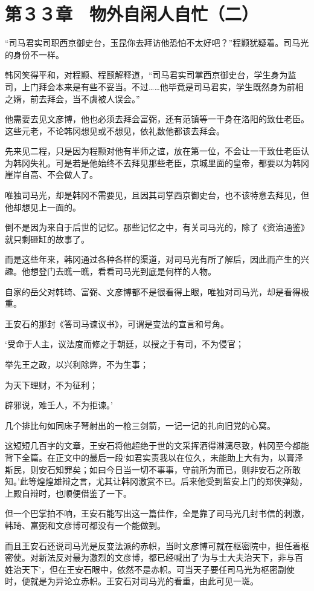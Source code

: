 \section{第３３章　物外自闲人自忙（二）}

“司马君实司职西京御史台，玉昆你去拜访他恐怕不太好吧？”程颢犹疑着。司马光的身份不一样。

韩冈笑得平和，对程颢、程颐解释道，“司马君实司掌西京御史台，学生身为监司，上门拜会本来是有些不妥当。不过……他毕竟是司马君实，学生既然身为前相之婿，前去拜会，当不虞被人误会。”

他需要去见文彦博，他也必须去拜会富弼，还有范镇等一干身在洛阳的致仕老臣。这些元老，不论韩冈想见或不想见，依礼数他都该去拜会。

先来见二程，只是因为程颢对他有半师之谊，放在第一位，不会让一干致仕老臣认为韩冈失礼。可是若是他始终不去拜见那些老臣，京城里面的皇帝，都要以为韩冈崖岸自高、不会做人了。

唯独司马光，却是韩冈不需要见，且因其司掌西京御史台，也不该特意去拜见，但他却想见上一面的。

倒不是因为来自于后世的记忆。那些记忆之中，有关司马光的，除了《资治通鉴》就只剩砸缸的故事了。

而是这些年来，韩冈通过各种各样的渠道，对司马光有所了解后，因此而产生的兴趣。他想登门去瞧一瞧，看看司马光到底是何样的人物。

自家的岳父对韩琦、富弼、文彦博都不是很看得上眼，唯独对司马光，却是看得极重。

王安石的那封《答司马谏议书》，可谓是变法的宣言和号角。

‘受命于人主，议法度而修之于朝廷，以授之于有司，不为侵官；

举先王之政，以兴利除弊，不为生事；

为天下理财，不为征利；

辟邪说，难壬人，不为拒谏。’

几个排比句如同床子弩射出的一枪三剑箭，一记一记的扎向旧党的心窝。

这短短几百字的文章，王安石将他超绝于世的文采挥洒得淋漓尽致，韩冈至今都能背下全篇。在正文中的最后一段‘如君实责我以在位久，未能助上大有为，以膏泽斯民，则安石知罪矣；如曰今日当一切不事事，守前所为而已，则非安石之所敢知。’此等煌煌雄辩之言，尤其让韩冈激赏不已。后来他受到监安上门的郑侠弹劾，上殿自辩时，也顺便借鉴了一下。

但一个巴掌拍不响，王安石能写出这一篇佳作，全是靠了司马光几封书信的刺激，韩琦、富弼和文彦博可都没有一个能做到。

而且王安石还说司马光是反变法派的赤帜，当时文彦博可就在枢密院中，担任着枢密使。对新法反对最为激烈的文彦博，都已经喊出了‘为与士大夫治天下，非与百姓治天下’，但在王安石眼中，依然不是赤帜。可当天子要任司马光为枢密副使时，便就是为异论立赤帜。王安石对司马光的看重，由此可见一斑。

